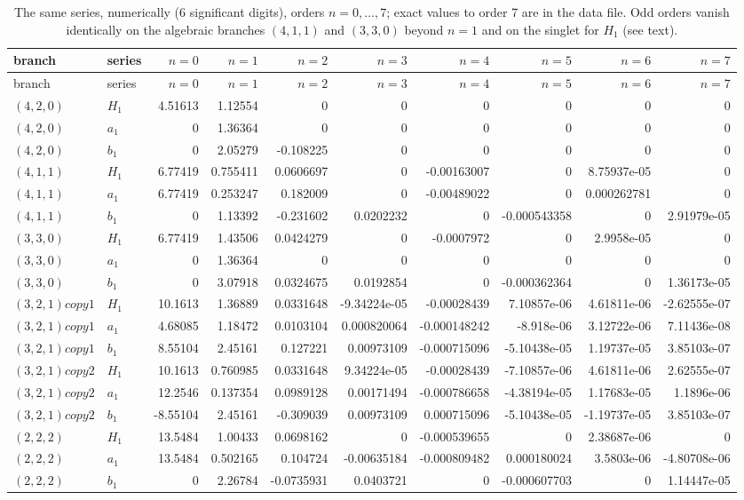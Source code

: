\documentclass[11pt]{article}
\begin{document}
{\tiny
\begin{longtable}{llrrrrrrrr}
\caption{The same series, numerically (6 significant digits), orders $n=0,\dots,7$; exact values to order 7 are in the data file.
Odd orders vanish identically on the algebraic branches $(4,1,1)$ and $(3,3,0)$ beyond $n=1$ and on the singlet for $H_1$ (see text).}\label{tab:series-num}\\
\toprule
branch & series & $n=0$ & $n=1$ & $n=2$ & $n=3$ & $n=4$ & $n=5$ & $n=6$ & $n=7$ \\
\midrule
\endfirsthead
\toprule
branch & series & $n=0$ & $n=1$ & $n=2$ & $n=3$ & $n=4$ & $n=5$ & $n=6$ & $n=7$ \\
\midrule
\endhead
\bottomrule
\endlastfoot
$(4,2,0)$ & $H_1$ & 4.51613 & 1.12554 & 0 & 0 & 0 & 0 & 0 & 0 \\
$(4,2,0)$ & $a_1$ & 0 & 1.36364 & 0 & 0 & 0 & 0 & 0 & 0 \\
$(4,2,0)$ & $b_1$ & 0 & 2.05279 & -0.108225 & 0 & 0 & 0 & 0 & 0 \\
$(4,1,1)$ & $H_1$ & 6.77419 & 0.755411 & 0.0606697 & 0 & -0.00163007 & 0 & 8.75937e-05 & 0 \\
$(4,1,1)$ & $a_1$ & 6.77419 & 0.253247 & 0.182009 & 0 & -0.00489022 & 0 & 0.000262781 & 0 \\
$(4,1,1)$ & $b_1$ & 0 & 1.13392 & -0.231602 & 0.0202232 & 0 & -0.000543358 & 0 & 2.91979e-05 \\
$(3,3,0)$ & $H_1$ & 6.77419 & 1.43506 & 0.0424279 & 0 & -0.0007972 & 0 & 2.9958e-05 & 0 \\
$(3,3,0)$ & $a_1$ & 0 & 1.36364 & 0 & 0 & 0 & 0 & 0 & 0 \\
$(3,3,0)$ & $b_1$ & 0 & 3.07918 & 0.0324675 & 0.0192854 & 0 & -0.000362364 & 0 & 1.36173e-05 \\
$(3,2,1) copy 1$ & $H_1$ & 10.1613 & 1.36889 & 0.0331648 & -9.34224e-05 & -0.00028439 & 7.10857e-06 & 4.61811e-06 & -2.62555e-07 \\
$(3,2,1) copy 1$ & $a_1$ & 4.68085 & 1.18472 & 0.0103104 & 0.000820064 & -0.000148242 & -8.918e-06 & 3.12722e-06 & 7.11436e-08 \\
$(3,2,1) copy 1$ & $b_1$ & 8.55104 & 2.45161 & 0.127221 & 0.00973109 & -0.000715096 & -5.10438e-05 & 1.19737e-05 & 3.85103e-07 \\
$(3,2,1) copy 2$ & $H_1$ & 10.1613 & 0.760985 & 0.0331648 & 9.34224e-05 & -0.00028439 & -7.10857e-06 & 4.61811e-06 & 2.62555e-07 \\
$(3,2,1) copy 2$ & $a_1$ & 12.2546 & 0.137354 & 0.0989128 & 0.00171494 & -0.000786658 & -4.38194e-05 & 1.17683e-05 & 1.1896e-06 \\
$(3,2,1) copy 2$ & $b_1$ & -8.55104 & 2.45161 & -0.309039 & 0.00973109 & 0.000715096 & -5.10438e-05 & -1.19737e-05 & 3.85103e-07 \\
$(2,2,2)$ & $H_1$ & 13.5484 & 1.00433 & 0.0698162 & 0 & -0.000539655 & 0 & 2.38687e-06 & 0 \\
$(2,2,2)$ & $a_1$ & 13.5484 & 0.502165 & 0.104724 & -0.00635184 & -0.000809482 & 0.000180024 & 3.5803e-06 & -4.80708e-06 \\
$(2,2,2)$ & $b_1$ & 0 & 2.26784 & -0.0735931 & 0.0403721 & 0 & -0.000607703 & 0 & 1.14447e-05 \\
\end{longtable}}
\end{document}
